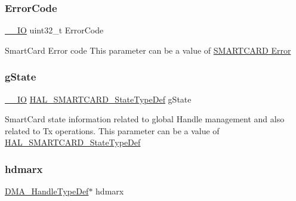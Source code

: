 \subsubsection{\texorpdfstring{Error\+Code}{ErrorCode}}
{\footnotesize\ttfamily \hyperlink{core__sc300_8h_aec43007d9998a0a0e01faede4133d6be}{\+\_\+\+\_\+\+IO} uint32\+\_\+t Error\+Code}

Smart\+Card Error code This parameter can be a value of \hyperlink{group___s_m_a_r_t_c_a_r_d___error}{S\+M\+A\+R\+T\+C\+A\+RD Error} \mbox{\label{struct_s_m_a_r_t_c_a_r_d___handle_type_def_ab83dd4a85483f5c160a277aeaae6d5df}} 
\subsubsection{\texorpdfstring{g\+State}{gState}}
{\footnotesize\ttfamily \hyperlink{core__sc300_8h_aec43007d9998a0a0e01faede4133d6be}{\+\_\+\+\_\+\+IO} \hyperlink{group___s_m_a_r_t_c_a_r_d___exported___types_ga79d6a3b95636861dcfd70913746e087e}{H\+A\+L\+\_\+\+S\+M\+A\+R\+T\+C\+A\+R\+D\+\_\+\+State\+Type\+Def} g\+State}

Smart\+Card state information related to global Handle management and also related to Tx operations. This parameter can be a value of \hyperlink{group___s_m_a_r_t_c_a_r_d___exported___types_ga79d6a3b95636861dcfd70913746e087e}{H\+A\+L\+\_\+\+S\+M\+A\+R\+T\+C\+A\+R\+D\+\_\+\+State\+Type\+Def} \mbox{\label{struct_s_m_a_r_t_c_a_r_d___handle_type_def_abd0aeec20298a55d89a440320e35634f}} 
\subsubsection{\texorpdfstring{hdmarx}{hdmarx}}
{\footnotesize\ttfamily \hyperlink{group___d_m_a___exported___types_ga92b907d56a9c29b93d46782a7a04f91e}{D\+M\+A\+\_\+\+Handle\+Type\+Def}$\ast$ hdmarx}

